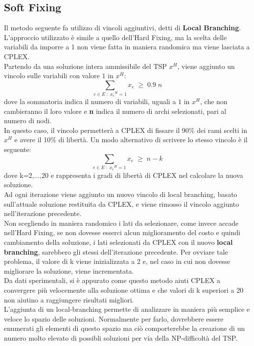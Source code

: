 \subsection{Soft Fixing}\label{soft fixing} %
Il metodo seguente fa utilizzo di vincoli aggiuntivi, detti di \textbf{Local Branching}. L'approccio utilizzato è simile a quello dell'Hard Fixing, ma la scelta delle variabili da imporre a 1 non viene fatta in maniera randomica ma viene lasciata a CPLEX.\\
Partendo da una soluzione intera ammissibile del TSP $x^H$, viene aggiunto un vincolo sulle variabili con valore $1$ in $x^H$:\\
$$\underset{e\in E\; : \; {x_e}^{H}=1}\sum{x_e}\;\geq\; 0.9\;n$$
dove la sommatoria indica il numero di variabili, uguali a $1$ in $x^H$, che non cambieranno il loro valore e \textbf{n} indica il numero di archi selezionati, pari al numero di nodi.\\
In questo caso, il vincolo permetterà a CPLEX di fissare il 90\% dei rami scelti in $x^H$ e avere il 10\% di libertà.
Un modo alternativo di scrivere lo stesso vincolo è il seguente:
$$\underset{e\in E\; : \; {x_e}^{H}=1}\sum{x_e}\;\geq\; n-k$$
dove k=2,...,20 e rappresenta i gradi di libertà di CPLEX nel calcolare la nuova soluzione.\\
Ad ogni iterazione viene aggiunto un nuovo vincolo di local branching, basato sull'attuale soluzione restituita da CPLEX, e viene rimosso il vincolo aggiunto nell'iterazione precedente.\\
Non scegliendo in maniera randomico i lati da selezionare, come invece accade nell'Hard Fixing, se non dovesse esserci alcun miglioramento del costo e quindi cambiamento della soluzione, i lati selezionati da CPLEX con il nuovo \textbf{local branching}, sarebbero gli stessi dell'iterazione precedente. Per ovviare tale problema, il valore di k viene inizializzata a 2 e, nel caso in cui non dovesse migliorare la soluzione, viene incrementata.\\
Da dati sperimentali, si è appurato come questo metodo aiuti CPLEX a convergere più velocemente alla soluzione ottima e che valori di k superiori a 20 non aiutino a raggiungere risultati migliori.\\
L'aggiunta di un local-branching permette di analizzare in maniera più semplice e veloce lo spazio delle soluzioni. Normalmente per farlo, dovrebbere essere enumerati gli elementi di questo spazio ma ciò comporterebbe la creazione di un numero molto elevato di possibli soluzioni per via della NP-difficoltà del TSP.\\

